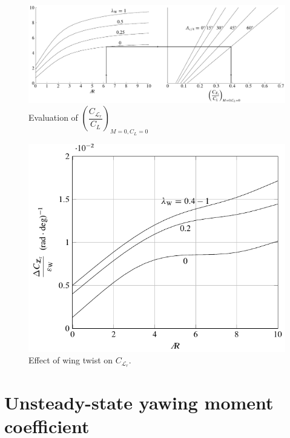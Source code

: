 \begin{figure}[p] 
\centering
\includegraphics[width=\textwidth]{Immagini/Capitolo2/4_85-CLR}
\caption[Evaluation of $(C_{\mathcal L_{\mathrm r}}/C_L)_{M=0,C_L=0}$ ] {Evaluation of $\left(\dfrac{C_{\mathcal L_r}}{C_L}\right)_{M=0, C_L=0}$}
\label{CLR}
\end{figure}

\begin{figure}[p] 
\centering
\includegraphics[width=.75\textwidth]{Immagini/Capitolo2/4_87-TwistEffect}
\caption[Effect of $\epsilon_\text W$ on $C_{\mathcal L_\mathrm r}$] {Effect of wing twist on $C_{\mathcal L_r}$.}
\label{effectwingtwistonlateralforce}
\end{figure}

\section{Unsteady-state yawing moment coefficient}
\label{sec2.6}

